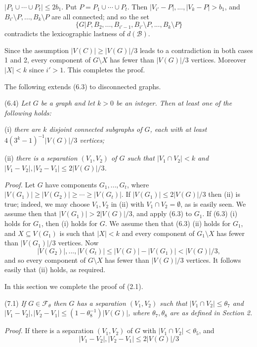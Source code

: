 \noindent $|P_1\cup\cdots\cup P_t|\le 2b_1$. Put $P=P_1\cup\cdots\cup P_t$. Then $|V_{i'}-P|,..., |V_k-P|>b_1$, and $B_{i'}\setminus P,..., B_k\setminus P$ are all connected; and so the set
\begin{equation*}
\{G|P, B_2,..., B_{i'-1}, B_{i'}\setminus P,..., B_k\setminus P\}
\end{equation*}
contradicts the lexicographic lastness of $d(\mathcal{B})$.

Since the assumption $|V(C)|\ge |V(G)|/3$ leads to a contradiction in both cases 1 and 2, every component of $G\setminus X$ has fewer than $|V(G)|/3$ vertices. Moreover $|X|<k$ since $i'>1$. This completes the proof.

The following extends (6.3) to disconnected graphs.

\stmt
(6.4) \textit{Let $G$ be a graph and let $k>0$ be an integer. Then at least one of the following holds:}

\hspace*{12pt}(i) \textit{there are $k$ disjoint connected subgraphs of $G$, each with at least $4(3^k-1)^{-1}|V(G)|/3$ vertices;}

\hspace*{12pt}(ii) \textit{there is a separation $(V_1, V_2)$ of $G$ such that $|V_1\cap V_2|<k$ and $|V_1 - V_2|, |V_2 - V_1|\le 2|V(G)|/3$.}

\textit{Proof.} Let $G$ have components $G_1,..., G_t$, where $|V(G_1)|\ge |V(G_2)|\ge \cdots \ge |V(G_t)|$. If $|V(G_1)|\le 2|V(G)|/3$ then (ii) is true; indeed, we may choose $V_1, V_2$ in (ii) with $V_1\cap V_2=\emptyset$, as is easily seen. We assume then that $|V(G_1)|>2|V(G)|/3$, and apply (6.3) to $G_1$. If (6.3) (i) holds for $G_1$, then (i) holds for $G$. We assume then that (6.3) (ii) holds for $G_1$, and $X\subseteq V(G_1)$ is such that $|X|<k$ and every component of $G_1\setminus X$ has fewer than $|V(G_1)|/3$ vertices. Now
\begin{equation*}
|V(G_2)|,..., |V(G_t)|\le |V(G)|-|V(G_1)| < |V(G)|/3,
\end{equation*}
and so every component of $G\setminus X$ has fewer than $|V(G)|/3$ vertices. It follows easily that (ii) holds, as required.


In this section we complete the proof of (2.1).

\stmt
(7.1) \textit{If $G\in \mathcal{F}_\theta$ then $G$ has a separation $(V_1, V_2)$ such that $|V_1\cap V_2|\le \theta_7$ and $|V_1 - V_2|, |V_2 - V_1|\le (1 - \theta_8^{-1})|V(G)|$, where $\theta_7, \theta_8$ are as defined in Section 2.}

\textit{Proof.} If there is a separation $(V_1, V_2)$ of $G$ with $|V_1\cap V_2|<\theta_5$, and
\begin{equation*}
|V_1 - V_2|, |V_2 - V_1|\le 2|V(G)|/3
\end{equation*}
